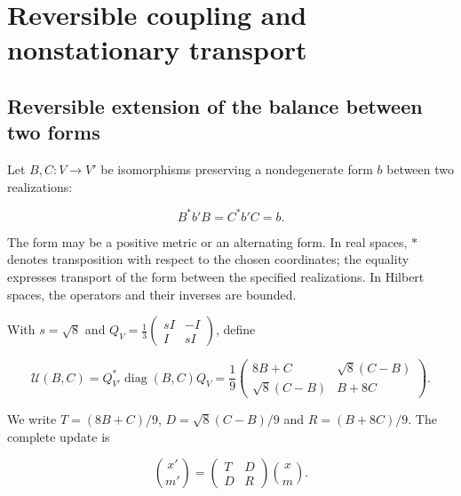 \chapter{Reversible coupling and nonstationary transport}
\label{x_reciprocidad:nuclear:10}
\section{Reversible extension of the balance between two forms}

Let \(B,C:V\to V'\) be isomorphisms preserving a nondegenerate form \(b\) between two realizations:



\[
B^*b'B=C^*b'C=b.
\]



The form may be a positive metric or an alternating form. In real spaces, \(*\) denotes transposition with respect to the chosen coordinates; the equality expresses transport of the form between the specified realizations. In Hilbert spaces, the operators and their inverses are bounded.

With \(s=\sqrt8\) and \(Q_V=\frac13\left(\begin{smallmatrix}sI&-I\\I&sI\end{smallmatrix}\right)\), define



\begin{equation}
\boxed{
\mathcal U(B,C)=Q_{V'}^*\operatorname{diag}(B,C)Q_V
=\frac19\begin{pmatrix}8B+C&\sqrt8(C-B)\\\sqrt8(C-B)&B+8C\end{pmatrix}.}
\label{x_reciprocidad:nuc10:eq:1}
\end{equation}



We write \(T=(8B+C)/9\), \(D=\sqrt8(C-B)/9\) and \(R=(B+8C)/9\). The complete update is



\begin{equation}
\binom{x'}{m'}=\begin{pmatrix}T&D\\D&R\end{pmatrix}\binom{x}{m}.
\label{x_reciprocidad:nuc10:eq:2}
\end{equation}



